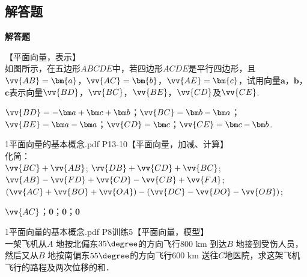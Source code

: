   \subsection{解答题}
  \begin{exercise}{\bf 解答题}
    \item 【平面向量，表示】\\
      如图所示，在五边形$ABCDE$中，若四边形$ACDE$是平行四边形，且$\vv{AB}=\bm{a}$，$\vv{AC}=\bm{b}$，$\vv{AE}=\bm{c}$，试用向量$\bm a$，$\bm b$，$\bm c$表示向量$\vv{BD}$，$\vv{BC}$，$\vv{BE}$，$\vv{CD}$及$\vv{CE}$.
      \begin{flushright}
      \end{flushright}
      \begin{answer}
        $\vv{BD}=-\bm a+\bm c+\bm b$；$\vv{BC}=\bm b-\bm a$；$\vv{BE}=\bm a-\bm a$；$\vv{CD}=\bm c$；$\vv{CE}=\bm c-\bm b$.
      \end{answer}
    \item 1平面向量的基本概念.pdf P13-10【平面向量，加减、计算】\\
      化简：\\
       $\vv{BC}+\vv{AB}$; \hspace{2em}  $\vv{DB}+\vv{CD}+\vv{BC}$;\\
       $\vv{AB}-\vv{FD}+\vv{CD}-\vv{CB}+\vv{FA}$;\hspace{2em}  $(\vv{AC}+\vv{BO}+\vv{OA})-(\vv{DC}-\vv{DO}-\vv{OB})$;\\
      \begin{answer}
        $\vv{AC}$；$\bm 0$；$\bm 0$；$\bm 0$
      \end{answer}
    \item 1平面向量的基本概念.pdf P8训练5【平面向量，模型】\\
      一架飞机从$A$ 地按北偏东$35\degree$的方向飞行800 km 到达$B$ 地接到受伤人员，然后又从$B$ 地按南偏东$55\degree$的方向飞行600 km 送往$C $地医院，求这架飞机飞行的路程及两次位移的和．

\end{exercise}
